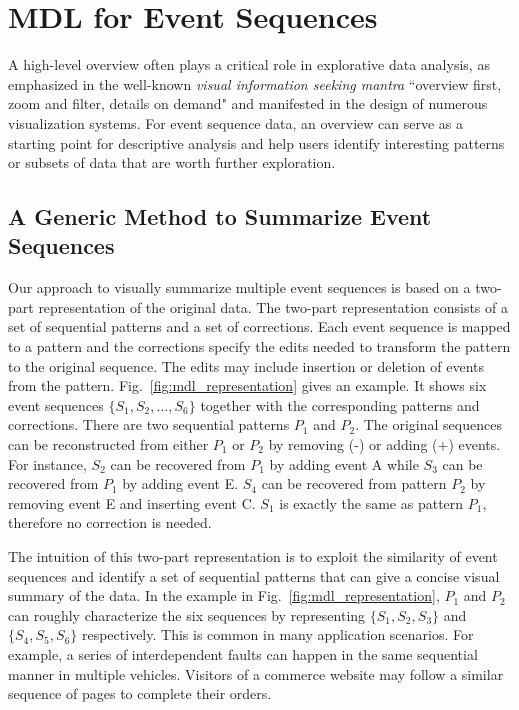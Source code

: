 
\section{MDL for Event Sequences}
\label{section:mdl}


A high-level overview often plays a critical role in explorative data analysis, as emphasized in the well-known \textit{visual information seeking mantra} ``overview first, zoom and filter, details on demand" \cite{shneiderman1996eyes} and manifested in the design of numerous visualization systems. For event sequence data, an overview can serve as a starting point for descriptive analysis \cite{plaisant2016tasks} and help users identify interesting patterns or subsets of data that are worth further exploration. 

\subsection{A Generic Method to Summarize Event Sequences}

Our approach to visually summarize multiple event sequences is based on a two-part representation of the original data. The two-part representation consists of a set of sequential patterns and a set of corrections. Each event sequence is mapped to a pattern and the corrections specify the edits needed to transform the pattern to the original sequence. The edits may include insertion or deletion of events from the pattern. Fig.~\ref{fig:mdl_representation} gives an example. It shows six event sequences $\{S_1, S_2, ..., S_6\}$ together with the corresponding patterns and corrections. There are two sequential patterns $P_1$ and $P_2$. The original sequences can be reconstructed from either $P_1$ or $P_2$ by removing (-) or adding (+) events. For instance, $S_2$ can be recovered from $P_1$ by adding event A while $S_3$ can be recovered from $P_1$ by adding event E. $S_4$ can be recovered from pattern $P_2$ by removing event E and inserting event C. $S_1$ is exactly the same as pattern $P_1$, therefore no correction is needed. 

The intuition of this two-part representation is to exploit the similarity of event sequences and identify a set of sequential patterns that can give a concise visual summary of the data. In the example in Fig.~\ref{fig:mdl_representation}, $P_1$ and $P_2$ can roughly characterize the six sequences by representing $\{S_1, S_2, S_3\}$ and $\{S_4, S_5, S_6\}$ respectively. This is common in many application scenarios. For example, a series of interdependent faults can happen in the same sequential manner in multiple vehicles. Visitors of a commerce website may follow a similar sequence of pages to complete their orders. 

